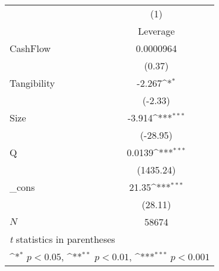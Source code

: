 {
\def\sym#1{\ifmmode^{#1}\else\(^{#1}\)\fi}
\begin{tabular}{l*{1}{c}}
\hline\hline
            &\multicolumn{1}{c}{(1)}\\
            &\multicolumn{1}{c}{Leverage}\\
\hline
CashFlow    &   0.0000964         \\
            &      (0.37)         \\
[1em]
Tangibility &      -2.267\sym{*}  \\
            &     (-2.33)         \\
[1em]
Size        &      -3.914\sym{***}\\
            &    (-28.95)         \\
[1em]
Q           &      0.0139\sym{***}\\
            &   (1435.24)         \\
[1em]
\_cons      &       21.35\sym{***}\\
            &     (28.11)         \\
\hline
\(N\)       &       58674         \\
\hline\hline
\multicolumn{2}{l}{\footnotesize \textit{t} statistics in parentheses}\\
\multicolumn{2}{l}{\footnotesize \sym{*} \(p<0.05\), \sym{**} \(p<0.01\), \sym{***} \(p<0.001\)}\\
\end{tabular}
}
